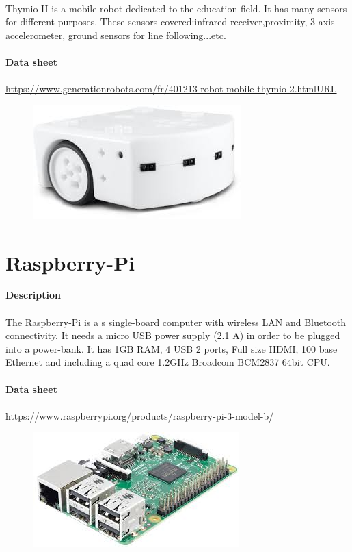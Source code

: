\documentclass[12pt]{report}
\begin{document}
	\paragraph{}
	Thymio II is a mobile robot dedicated to the education field. It has many sensors for different purposes. These sensors covered:infrared receiver,proximity, 3 axis accelerometer, ground sensors for line following...etc.
	\\ \\
	\textbf{Data sheet} 
	\paragraph{}
	\url{https://www.generationrobots.com/fr/401213-robot-mobile-thymio-2.htmlURL}
	\begin{figure}[H]
		\begin{center}
			\includegraphics[scale=0.6]{res/thymio.jpg}
		\end{center}
	\end{figure}
	\section{Raspberry-Pi}
	\textbf{Description}
	\paragraph{}
	The Raspberry-Pi is a s single-board computer with wireless LAN and Bluetooth connectivity. It needs a micro USB power supply (2.1 A) in order to be plugged into a power-bank. It has 1GB RAM, 4 USB 2 ports, Full size HDMI, 100 base Ethernet and including a quad core 1.2GHz Broadcom BCM2837 64bit CPU.\\ \\
	\textbf{Data sheet} 
	\paragraph{}
	\url{https://www.raspberrypi.org/products/raspberry-pi-3-model-b/}
	\begin{figure}[H]
		\begin{center}
			\includegraphics[scale=0.6]{res/raspberry.jpg}
		\end{center}
	\end{figure}
\end{document}
